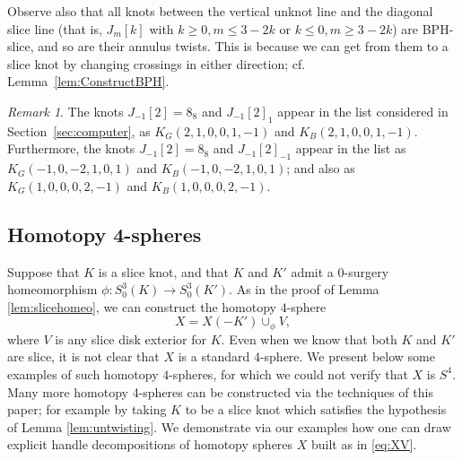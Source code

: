 \documentclass [11pt]{amsart}
\theoremstyle{remark}
\newtheorem {remark}[theorem]{Remark}
\begin{document}
Observe also that all knots between the vertical unknot line and the diagonal slice line (that is, $J_m[k]$ with $k\geq 0, m \leq 3-2k$ or $k \leq 0, m \geq 3-2k$) are BPH-slice, and so are their annulus twists. This is because we can get from them to a slice knot by changing crossings in either direction; cf. Lemma~\ref{lem:ConstructBPH}. 

\begin{remark}
The knots $J_{-1}[2]=8_8$ and $J_{-1}[2]_1$ appear in the list considered in Section~\ref{sec:computer}, as $K_G(2,1,0,0,1,-1)$ and $K_B(2,1,0,0,1,-1)$. Furthermore, the knots $J_{-1}[2]=8_8$ and $J_{-1}[2]_{-1}$ appear in the list as $K_G(-1,0,-2,1,0,1)$ and $K_B(-1,0,-2,1,0,1)$; and also as $K_G(1,0,0,0,2,-1)$ and $K_B(1,0,0,0,2,-1)$.
\end{remark} 

\subsection{Homotopy 4-spheres} 
Suppose that $K$ is a slice knot, and that $K$ and $K'$ admit a $0$-surgery homeomorphism $\phi: S^3_0(K) \to S^3_0(K')$. As in the proof of Lemma \ref{lem:slicehomeo}, we can construct the homotopy $4$-sphere
\begin{equation}
\label{eq:XV}
X=X(-K') \cup_{\phi} V,
\end{equation}
where $V$ is any slice disk exterior for $K$. Even when we know that both $K$ and $K'$ are slice, it is not clear that $X$ is a standard $4$-sphere. We present below some examples of such homotopy $4$-spheres, for which we could not verify that $X$ is $S^4$. Many more homotopy 4-spheres can be constructed via the techniques of this paper; for example by taking $K$ to be a slice knot which satisfies the hypothesis of Lemma \ref{lem:untwisting}. We demonstrate via our examples how one can draw explicit handle decompositions of homotopy spheres $X$ built as in \eqref{eq:XV}. 
\end{document}
